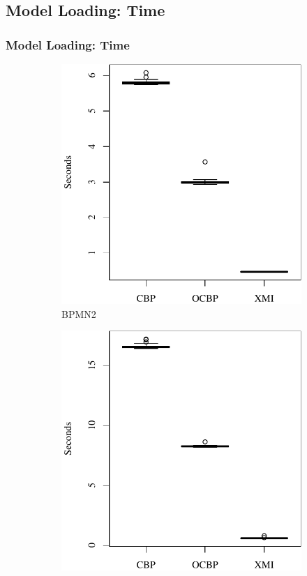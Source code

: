 \documentclass{beamer}
\begin{document}
\begin{frame}[fragile]
\section{Model Loading: Time}
\frametitle{Model Loading: Time}
\begin{figure}[ht]
    \begin{subfigure}{0.325\textwidth}
        \centering
        \includegraphics[width=\linewidth]{load_time_bpmn2}
        \caption{BPMN2}
        \label{fig:load_time_bpmn2}
    \end{subfigure}
    \hfill
    \begin{subfigure}{0.325\textwidth}
        \centering
        \includegraphics[width=\linewidth]{load_time_epsilon}

\end{subfigure}
\end{figure}
\end{frame}
\end{document}
